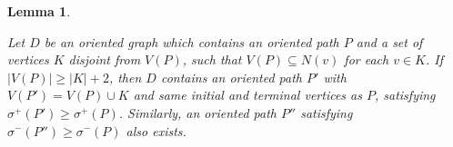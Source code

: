 \documentclass[11pt]{article}
\newtheorem{lemma}[theorem]{Lemma}
\newcommand{\QGr}[1]{{#1}}
\newcommand{\2}{\vspace{0.2cm}}
\begin{document}
	\begin{lemma}\label{lem:add x between pair}

    \QGr{Let $D$ be an oriented graph which contains an oriented path $P$ and a set of vertices $K$ disjoint from $V(P)$, such that $V(P)\subseteq N(v)$ for each $v\in K$. If $|V(P)|\ge |K|+2$, then $D$ contains an oriented path $P'$ with $V(P')=V(P)\cup K$ and same initial and terminal vertices as $P$, satisfying $\sigma^+(P')\ge \sigma^+(P) $. Similarly, an oriented path $P''$ satisfying $\sigma^-(P'') \ge \sigma^-(P)$ also exists.}
	\end{lemma}
\end{document}
